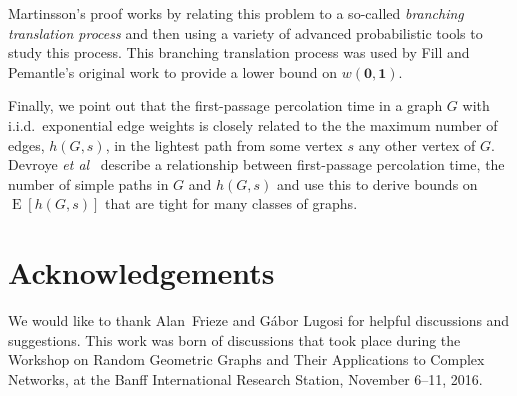 \documentclass[a4paper,UKenglish]{lipics-v2016}
\DeclareMathOperator{\E}{E}
\newcommand{\zero}{\mathbf{0}}
\newcommand{\one}{\mathbf{1}}
\newcommand{\etal}{\emph{et al}}
\begin{document}
Martinsson's proof \cite{martinsson:unoriented} works by relating this
problem to a so-called \emph{branching translation process} and then
using a variety of advanced probabilistic tools to study this process.
This branching translation process was used by Fill and Pemantle's
original work to provide a lower bound on $w(\zero,\one)$.

Finally, we point out that the first-passage percolation time in a
graph $G$ with i.i.d.\ exponential edge weights is closely related
to the the maximum number of edges, $h(G,s)$, in the lightest
path from some vertex $s$ any other vertex of $G$.  Devroye \etal\
\cite{devroye.dujmovic.ea:notes} describe a relationship between
first-passage percolation time, the number of simple paths in $G$ and
$h(G,s)$ and use this to derive bounds on $\E[h(G,s)]$ that are tight
for many classes of graphs.


\section*{Acknowledgements}

We would like to thank Alan~Frieze and G\'abor Lugosi for helpful
discussions and suggestions.  This work was born of discussions that
took place during the Workshop on Random Geometric Graphs and Their
Applications to Complex Networks, at the Banff International Research
Station, November 6--11, 2016.


\end{document}
